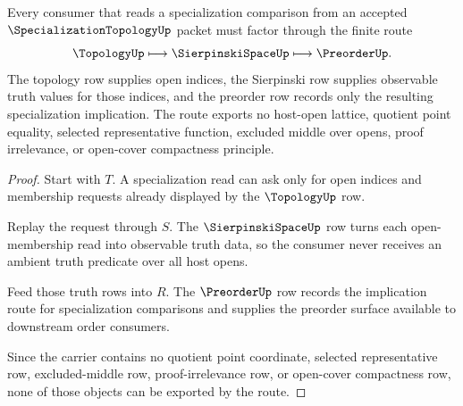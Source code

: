 \begin{theorem}
\label{thm:specialization-topology-sierpinski-preorder-route}
Every consumer that reads a specialization comparison from an accepted $\SpecializationTopologyUp$ packet must factor through the finite route
$$
\TopologyUp \longmapsto \SierpinskiSpaceUp \longmapsto \PreorderUp .
$$
The topology row supplies open indices, the Sierpinski row supplies observable truth values for those indices, and the preorder row records only the resulting specialization implication. The route exports no host-open lattice, quotient point equality, selected representative function, excluded middle over opens, proof irrelevance, or open-cover compactness principle.
\end{theorem}
\begin{proof}
Start with $T$. A specialization read can ask only for open indices and membership requests already displayed by the $\TopologyUp$ row.

Replay the request through $S$. The $\SierpinskiSpaceUp$ row turns each open-membership read into observable truth data, so the consumer never receives an ambient truth predicate over all host opens.

Feed those truth rows into $R$. The $\PreorderUp$ row records the implication route for specialization comparisons and supplies the preorder surface available to downstream order consumers.

Since the carrier contains no quotient point coordinate, selected representative row, excluded-middle row, proof-irrelevance row, or open-cover compactness row, none of those objects can be exported by the route.
\end{proof}




